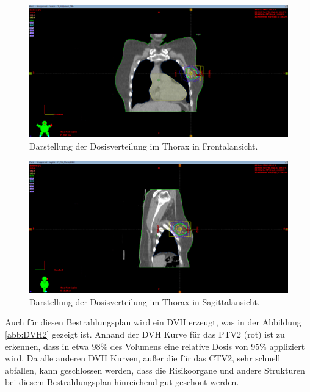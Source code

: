 \begin{figure}[H]
  \centering
  \includegraphics[width=\textwidth]{Bilder/Mamma2_Y.png}
  \caption{Darstellung der Dosisverteilung im Thorax in Frontalansicht.}
  \label{abb:Y2}
\end{figure}

\begin{figure}[H]
  \centering
  \includegraphics[width=\textwidth]{Bilder/Mamma2_X.png}
  \caption{Darstellung der Dosisverteilung im Thorax in Sagittalansicht.}
  \label{abb:X2}
\end{figure}

Auch für diesen Bestrahlungsplan wird ein DVH erzeugt, was in der Abbildung \ref{abb:DVH2}
gezeigt ist. Anhand der DVH Kurve für das PTV2 (rot) ist zu erkennen, dass in etwa $98\%$
des Volumens eine relative Dosis von $95\%$ appliziert wird. Da alle anderen DVH Kurven, außer die für das CTV2,
sehr schnell abfallen, kann geschlossen werden, dass die Risikoorgane und andere Strukturen bei
diesem Bestrahlungsplan hinreichend gut geschont werden.


